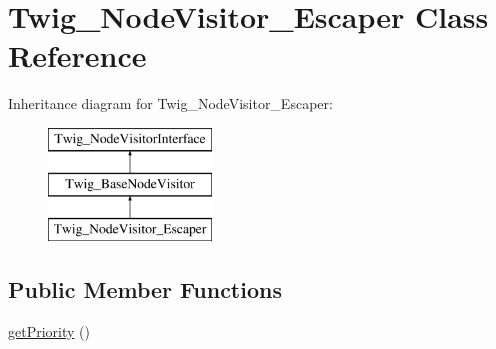 \hypertarget{classTwig__NodeVisitor__Escaper}{}\section{Twig\+\_\+\+Node\+Visitor\+\_\+\+Escaper Class Reference}
\label{classTwig__NodeVisitor__Escaper}
Inheritance diagram for Twig\+\_\+\+Node\+Visitor\+\_\+\+Escaper\+:\begin{figure}[H]
\begin{center}
\leavevmode
\includegraphics[height=3.000000cm]{classTwig__NodeVisitor__Escaper}
\end{center}
\end{figure}
\subsection*{Public Member Functions}
\begin{DoxyCompactItemize}
\item 
\hyperlink{classTwig__NodeVisitor__Escaper_a71387c005f5e9e4b567221d59b36293e}{get\+Priority} ()
\end{DoxyCompactItemize}
